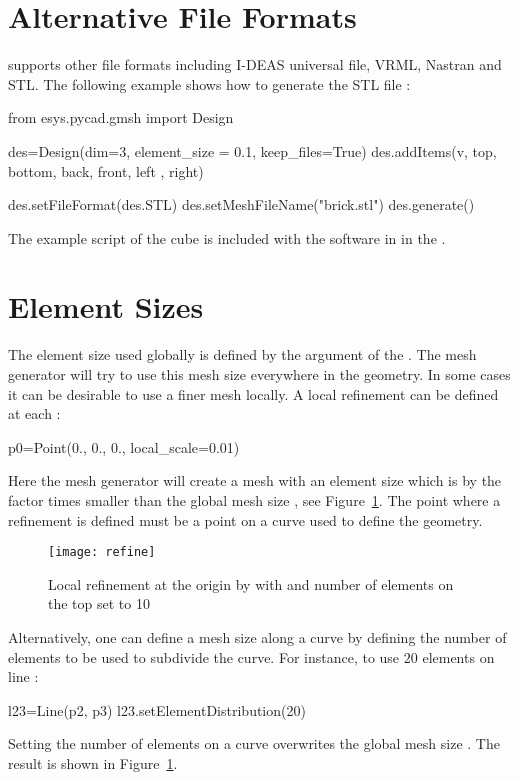 \section{Alternative File Formats}
\pycad supports other file formats including I-DEAS universal file, VRML,
Nastran and STL. The following example shows how to generate the STL file
:
\begin{python}
  from esys.pycad.gmsh import Design

  des=Design(dim=3, element_size = 0.1, keep_files=True)
  des.addItems(v, top, bottom, back, front, left , right)

  des.setFileFormat(des.STL)
  des.setMeshFileName("brick.stl")
  des.generate()
\end{python}
The example script of the cube is included with the software in
 in the \ExampleDirectory.

\section{Element Sizes}
The element size used globally is defined by the  argument
of the . The mesh generator will try to use this mesh size
everywhere in the geometry. In some cases it can be desirable to use a finer
mesh locally. A local refinement can be defined at each :
\begin{python}
  p0=Point(0., 0., 0., local_scale=0.01)
\end{python}
Here the mesh generator will create a mesh with an element size which is by
the factor  times smaller than the global mesh size
, see Figure~\ref{fig:PYCAD 5}.
The point where a refinement is defined must be a point on a curve used to
define the geometry.

\begin{figure}
\centerline{\texttt{[image: refine]}}
\caption{Local refinement at the origin by 
with  and number of elements on the top set to 10}
\label{fig:PYCAD 5}
\end{figure}

Alternatively, one can define a mesh size along a curve by defining the number
of elements to be used to subdivide the curve. For instance, to use $20$
elements on line :
\begin{python}
  l23=Line(p2, p3)
  l23.setElementDistribution(20)
\end{python}
Setting the number of elements on a curve overwrites the global mesh size
. The result is shown in Figure~\ref{fig:PYCAD 5}.

